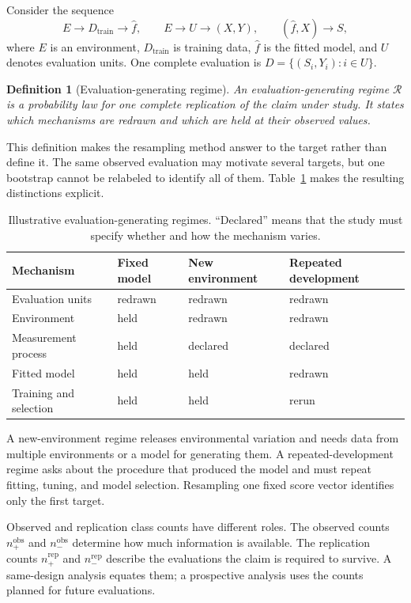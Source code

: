 \documentclass[11pt]{article}
\newcommand{\Regime}{\mathcal{R}}
\newtheorem{definition}{Definition}
\theoremstyle{remark}
\begin{document}
Consider the sequence
\[
E
\longrightarrow D_{\mathrm{train}}
\longrightarrow \widehat f,
\qquad
E\longrightarrow U\longrightarrow(X,Y),
\qquad
(\widehat f,X)\longrightarrow S,
\]
where $E$ is an environment, $D_{\mathrm{train}}$ is training data, $\widehat f$ is the fitted model, and $U$ denotes evaluation units. One complete evaluation is $D=\{(S_i,Y_i):i\in U\}$.

\begin{definition}[Evaluation-generating regime]
An evaluation-generating regime $\Regime$ is a probability law for one complete replication of the claim under study. It states which mechanisms are redrawn and which are held at their observed values.
\end{definition}

This definition makes the resampling method answer to the target rather than define it. The same observed evaluation may motivate several targets, but one bootstrap cannot be relabeled to identify all of them. Table~\ref{tab:regimes} makes the resulting distinctions explicit.

\begin{table}[ht]
\centering
\caption{Illustrative evaluation-generating regimes. ``Declared'' means that the study must specify whether and how the mechanism varies.}
\label{tab:regimes}
\begin{tabularx}{\textwidth}{@{}>{\raggedright\arraybackslash}p{}XXX@{}}
\toprule
Mechanism & Fixed model & New environment & Repeated development \\
\midrule
Evaluation units & redrawn & redrawn & redrawn \\
Environment & held & redrawn & redrawn \\
Measurement process & held & declared & declared \\
Fitted model & held & held & redrawn \\
Training and selection & held & held & rerun \\
\bottomrule
\end{tabularx}
\end{table}

A new-environment regime releases environmental variation and needs data from multiple environments or a model for generating them. A repeated-development regime asks about the procedure that produced the model and must repeat fitting, tuning, and model selection. Resampling one fixed score vector identifies only the first target.

Observed and replication class counts have different roles. The observed counts $n_+^{\mathrm{obs}}$ and $n_-^{\mathrm{obs}}$ determine how much information is available. The replication counts $n_+^{\mathrm{rep}}$ and $n_-^{\mathrm{rep}}$ describe the evaluations the claim is required to survive. A same-design analysis equates them; a prospective analysis uses the counts planned for future evaluations.
\end{document}
